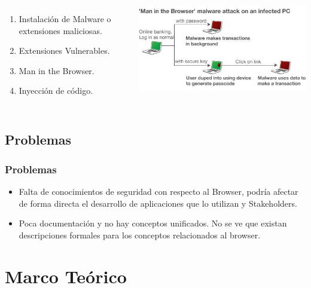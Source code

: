 \documentclass[serif,9pt]{beamer}
\begin{document}
\begin{frame}
\begin{columns}
\begin{minipage}[c][0.4\textheight][c]{\linewidth}
	  \begin{enumerate}
	  \item Instalaci\'on de Malware o extensiones maliciosas.
	  \item Extensiones Vulnerables.
	  \item Man in the Browser.
	  \item Inyección de código.
	  \end{enumerate}
	\end{minipage}
	\begin{minipage}[c][0.4\textheight][c]{\linewidth}
	  \centering
	  \includegraphics[scale=0.45]{figures/_58291188_malware_464v2.jpg}
	\end{minipage}
	\end{columns}
\end{frame}

\subsection{Problemas}
\begin{frame}
	\frametitle{Problemas}
	\begin{itemize}
		\item<1-> Falta de conocimientos de seguridad con respecto al Browser, podr\'ia afectar de forma directa el desarrollo de aplicaciones que lo utilizan y Stakeholders. 
		\item<2-> Poca documentaci\'on y no hay conceptos unificados. No se ve que existan descripciones formales para los conceptos relacionados al browser.
	\end{itemize}
\end{frame}

\section{Marco Teórico}
\end{document}
